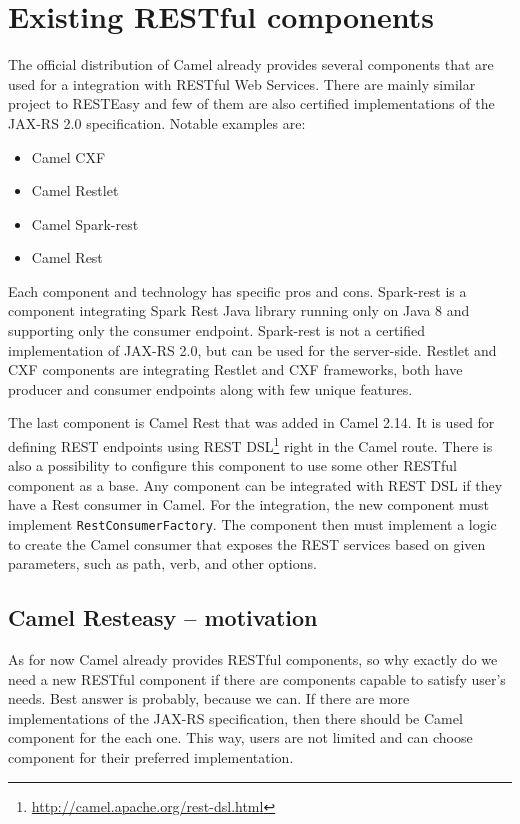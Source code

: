 \documentclass[12pt,final,oneside]{fithesis2}
\begin{document}


\section{Existing RESTful components}
The official distribution of Camel already provides several components that are used for a integration with RESTful Web Services. There are mainly similar project to RESTEasy and few of them are also certified implementations of the JAX-RS 2.0 specification. Notable examples are:
\begin{itemize}
\item
Camel CXF

\item
Camel Restlet

\item
Camel Spark-rest

\item
Camel Rest
\end{itemize}

Each component and technology has specific pros and cons. Spark-rest is a component integrating Spark Rest Java library running only on Java 8 and supporting only the consumer endpoint. Spark-rest is not a certified implementation of JAX-RS 2.0, but can be used for the server-side. Restlet and CXF components are integrating Restlet and CXF frameworks, both have producer and consumer endpoints along with few unique features. 

The last component is Camel Rest that was added in Camel 2.14. It is used for defining REST endpoints using REST DSL\footnote{\url{http://camel.apache.org/rest-dsl.html}} right in the Camel route. There is also a possibility to configure this component to use some other RESTful component as a base. Any component can be integrated with REST DSL if they have a Rest consumer in Camel. For the integration, the new component must implement \texttt{RestConsumerFactory}. The component then must implement a logic to create the Camel consumer that exposes the REST services based on given parameters, such as path, verb, and other options.

\subsection{Camel Resteasy -- motivation}
As for now Camel already provides RESTful components, so why exactly do we need a new RESTful component if there are components capable to satisfy user's needs. Best answer is probably, because we can. If there are more implementations of the JAX-RS specification, then there should be Camel component for the each one. This way, users are not limited and can choose component for their preferred implementation. 
\end{document}
